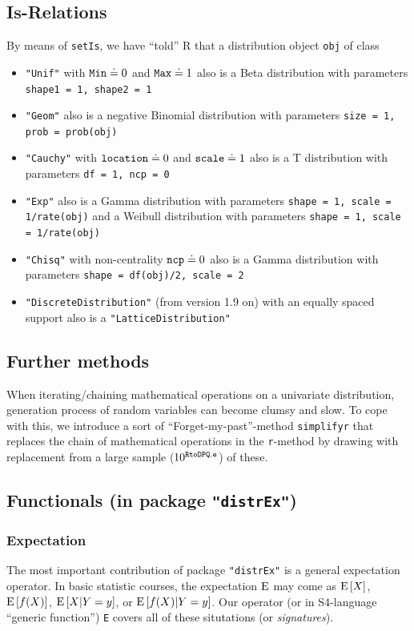 \documentclass[11pt]{article}
\newcommand{\code}[1]{{\tt #1}}
\newcommand{\pkg}[1]{{\tt "#1"}}
\begin{document}
\subsection{Is-Relations}
%
By means of \code{setIs}, we have ``told'' {\sf R}  that a distribution object 
\code{obj} of class
\begin{itemize}
  \item  \code{"Unif"} with  $\code{Min} \doteq 0$ and  $\code{Max} \doteq 1$ 
   also is a Beta distribution with parameters \code{shape1 = 1, shape2 = 1}
  \item  \code{"Geom"} also is a negative Binomial distribution with parameters
         \code{size = 1, prob = prob(obj)}
  \item \code{"Cauchy"} with $\code{location} \doteq 0$ and 
         $\code{scale}\doteq 1$ also is a T distribution with parameters
         \code{df = 1, ncp = 0}
  \item \code{"Exp"} also is a Gamma distribution with parameters 
         \code{shape = 1, scale = 1/rate(obj)} and
         a Weibull  distribution with parameters 
         \code{shape = 1, scale = 1/rate(obj)}
  \item \code{"Chisq"} with non-centrality $\code{ncp}\doteq 0$ also is a 
        Gamma distribution with parameters \code{shape = df(obj)/2, scale = 2}
  \item \code{"DiscreteDistribution"}  (from version 1.9 on) with an equally 
         spaced support also is a \code{"LatticeDistribution"}
\end{itemize}
%
\subsection{Further methods}
%
When iterating/chaining mathematical operations on a univariate distribution,
generation process of random variables can become clumsy and slow.
To cope with this, we introduce a sort of ``Forget-my-past''-method 
\code{simplifyr} that replaces the  chain of mathematical operations in 
the \code{r}-method by drawing with replacement from a large 
sample ($10^{\tt RtoDPQ.e}$) of these.
%
\subsection[Functionals (in package distrEx)]%
{Functionals (in package \pkg{distrEx})}\label{Functionals}
%
\subsubsection{Expectation}
The most important contribution of package \pkg{distrEx} is a general 
expectation operator. In basic statistic courses, the expectation 
${\rm E}$ may come as ${\rm E}\,[X]$, ${\rm E}\,[f(X)]$, ${\rm E}\,[X|Y=y]$,
or ${\rm E}\,[f(X)|Y=y]$. Our operator (or in S4-language ``generic function'') 
\code{E} covers all of these situtations (or {\it signatures\/}).
\end{document}
